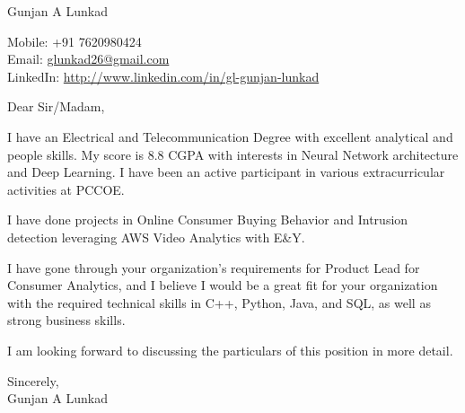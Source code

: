 \documentclass[a4paper,12pt]{letter}
\begin{document}
\begin{letter}{}

    \begin{center}
        Gunjan A Lunkad
    \end{center}

    \begin{flushright}
        Mobile: +91 7620980424 \\
        Email: \href{mailto:glunkad26@gmail.com}{glunkad26@gmail.com} \\
        LinkedIn: \href{http://www.linkedin.com/in/gl-gunjan-lunkad}{http://www.linkedin.com/in/gl-gunjan-lunkad}
    \end{flushright}

    \opening{Dear Sir/Madam,}

    I have an Electrical and Telecommunication Degree with excellent analytical and people skills. My score is 8.8 CGPA with interests in Neural Network architecture and Deep Learning. I have been an active participant in various extracurricular activities at PCCOE.

    I have done projects in Online Consumer Buying Behavior and Intrusion detection leveraging AWS Video Analytics with E\&Y.

    I have gone through your organization's requirements for Product Lead for Consumer Analytics, and I believe I would be a great fit for your organization with the required technical skills in C++, Python, Java, and SQL, as well as strong business skills.

    I am looking forward to discussing the particulars of this position in more detail.

    \closing{Sincerely, \\ Gunjan A Lunkad }
    \vspace{2cm}  %



\end{letter}
\end{document}
